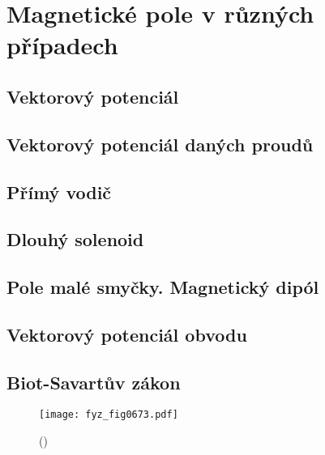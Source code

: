 \setchaptertoc
\chapter{Magnetické pole v různých případech}\label{fyz:IIchapXIV}


  \section{Vektorový potenciál}\label{fyz:IIchapXIVsecI}
  \section{Vektorový potenciál daných proudů}\label{fyz:IIchapXIVsecII}
  \section{Přímý vodič}\label{fyz:IIchapXIVsecIII}
  \section{Dlouhý solenoid}\label{fyz:IIchapXIVsecIV}
  \section{Pole malé smyčky. Magnetický dipól}\label{fyz:IIchapXIVsecV}
  \section{Vektorový potenciál obvodu}\label{fyz:IIchapXIVsecVI}
  \section{Biot-Savartův zákon}\label{fyz:IIchapXIVsecVII}

    \begin{figure}[ht!] %
      \centering
      \texttt{[image: fyz\_fig0673.pdf]}
      \caption{
               (\cite[s.~707]{Feynman02})}
      \label{fyz:fig0673}
    \end{figure}

